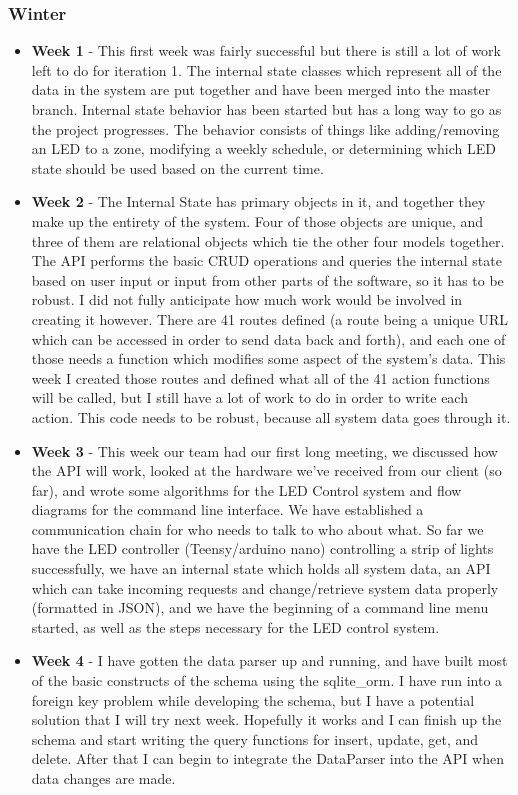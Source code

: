 \documentclass[onecolumn, draftclsnofoot,10pt, compsoc]{IEEEtran}
\begin{document}
			\subsubsection{Winter}
			\begin{itemize}
					\item \textbf{Week 1} - This first week was fairly successful but there is still a lot of work left to do for iteration 1. The internal state classes which represent all of the data in the system are put together and have been merged into the master branch. Internal state behavior has been started but has a long way to go as the project progresses. The behavior consists of things like adding/removing an LED to a zone, modifying a weekly schedule, or determining which LED state should be used based on the current time.
					\item \textbf{Week 2} - The Internal State has primary objects in it, and together they make up the entirety of the system. Four of those objects are unique, and three of them are relational objects which tie the other four models together. The API performs the basic CRUD operations and queries the internal state based on user input or input from other parts of the software, so it has to be robust. I did not fully anticipate how much work would be involved in creating it however. There are 41 routes defined (a route being a unique URL which can be accessed in order to send data back and forth), and each one of those needs a function which modifies some aspect of the system's data. This week I created those routes and defined what all of the 41 action functions will be called, but I still have a lot of work to do in order to write each action. This code needs to be robust, because all system data goes through it.
					\item \textbf{Week 3} - This week our team had our first long meeting, we discussed how the API will work, looked at the hardware we've received from our client (so far), and wrote some algorithms for the LED Control system and flow diagrams for the command line interface. We have established a communication chain for who needs to talk to who about what. So far we have the LED controller (Teensy/arduino nano) controlling a strip of lights successfully, we have an internal state which holds all system data, an API which can take incoming requests and change/retrieve system data properly (formatted in JSON), and we have the beginning of a command line menu started, as well as the steps necessary for the LED control system.
					\item \textbf{Week 4} - I have gotten the data parser up and running, and have built most of the basic constructs of the schema using the sqlite\_orm. I have run into a foreign key problem while developing the schema, but I have a potential solution that I will try next week. Hopefully it works and I can finish up the schema and start writing the query functions for insert, update, get, and delete. After that I can begin to integrate the DataParser into the API when data changes are made.

\end{itemize}
\end{document}
